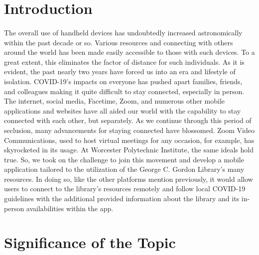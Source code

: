 \section{Introduction}
\paragraph{}
The overall use of handheld devices has undoubtedly increased astronomically within the past decade or so. Various resources and connecting with others around the world has been made easily accessible to those with such devices. To a great extent, this eliminates the factor of distance for such individuals. As it is evident, the past nearly two years have forced us into an era and lifestyle of isolation. COVID-19's impacts on everyone has pushed apart families, friends, and colleagues making it quite difficult to stay connected, especially in person. The internet, social media, Facetime, Zoom, and numerous other mobile applications and websites have all aided our world with the capability to stay connected with each other, but separately. As we continue through this period of seclusion, many advancements for staying connected have blossomed. Zoom Video Communications, used to host virtual meetings for any occasion, for example, has skyrocketed in its usage. At Worcester Polytechnic Institute, the same ideals hold true. So, we took on the challenge to join this movement and develop a mobile application tailored to the utilization of the George C. Gordon Library's many resources. In doing so, like the other platforms mention previously, it would allow users to connect to the library's resources remotely and follow local COVID-19 guidelines with the additional provided information about the library and its in-person availabilities within the app.

\section{Significance of the Topic}
